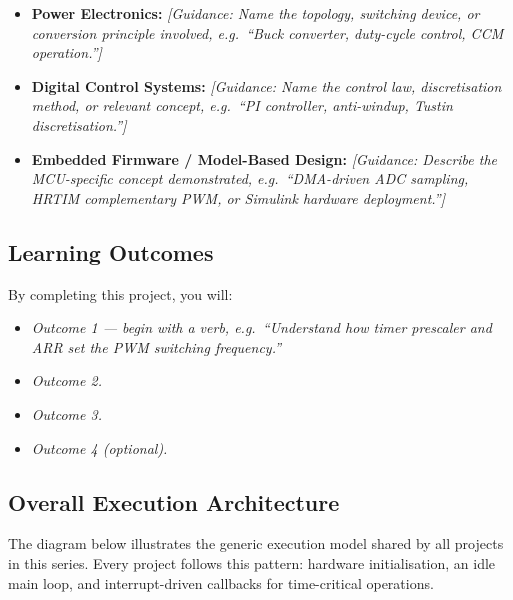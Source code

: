 \begin{itemize}
    \item \textbf{Power Electronics:} \textit{[Guidance: Name the
    topology, switching device, or conversion principle involved,
    e.g.\ ``Buck converter, duty-cycle control, CCM operation.'']}

    \item \textbf{Digital Control Systems:} \textit{[Guidance:
    Name the control law, discretisation method, or relevant
    concept, e.g.\ ``PI controller, anti-windup, Tustin
    discretisation.'']}

    \item \textbf{Embedded Firmware / Model-Based Design:}
    \textit{[Guidance: Describe the MCU-specific concept
    demonstrated, e.g.\ ``DMA-driven ADC sampling, HRTIM
    complementary PWM, or Simulink hardware deployment.'']}
\end{itemize}

\subsection{Learning Outcomes}

By completing this project, you will:

\begin{itemize}
    \item \textit{Outcome 1 --- begin with a verb, e.g.\ ``Understand
    how timer prescaler and ARR set the PWM switching frequency.''}
    \item \textit{Outcome 2.}
    \item \textit{Outcome 3.}
    \item \textit{Outcome 4 (optional).}
\end{itemize}

\subsection{Overall Execution Architecture}

The diagram below illustrates the generic execution model shared
by all projects in this series. Every project follows this
pattern: hardware initialisation, an idle main loop, and
interrupt-driven callbacks for time-critical operations.


